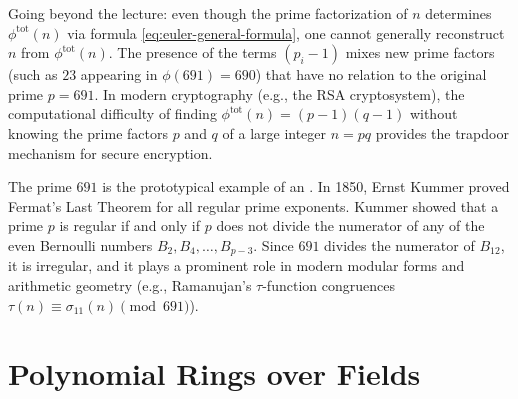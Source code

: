 \begin{content}

\begin{steps}
Going beyond the lecture: even though the prime factorization of $n$ determines $\phi^{\text{tot}}(n)$ via formula \eqref{eq:euler-general-formula}, one cannot generally reconstruct $n$ from $\phi^{\text{tot}}(n)$. The presence of the terms $(p_i - 1)$ mixes new prime factors (such as $23$ appearing in $\phi(691) = 690$) that have no relation to the original prime $p = 691$. In modern cryptography (e.g., the RSA cryptosystem), the computational difficulty of finding $\phi^{\text{tot}}(n) = (p - 1)(q - 1)$ without knowing the prime factors $p$ and $q$ of a large integer $n = pq$ provides the trapdoor mechanism for secure encryption.
\end{steps}
\end{content}

\begin{aiNote}
The prime $691$ is the prototypical example of an . In 1850, Ernst Kummer proved Fermat's Last Theorem for all regular prime exponents. Kummer showed that a prime $p$ is regular if and only if $p$ does not divide the numerator of any of the even Bernoulli numbers $B_2, B_4, \dots, B_{p-3}$. Since $691$ divides the numerator of $B_{12}$, it is irregular, and it plays a prominent role in modern modular forms and arithmetic geometry (e.g., Ramanujan's $\tau$-function congruences $\tau(n) \equiv \sigma_{11}(n) \pmod{691}$).
\end{aiNote}

\section{Polynomial Rings over Fields}

